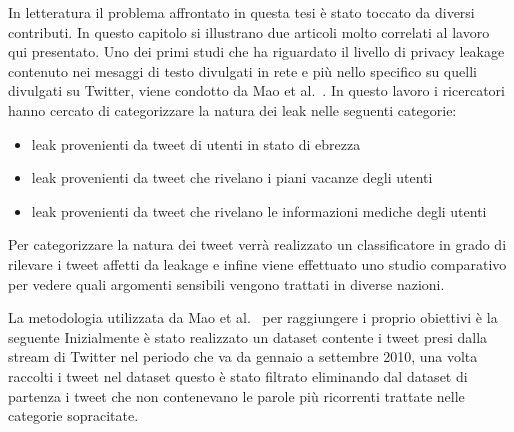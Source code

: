 In letteratura il problema affrontato in questa tesi è stato toccato da diversi contributi. In questo capitolo si illustrano due articoli molto correlati al lavoro qui presentato. Uno dei primi studi che ha riguardato il livello di privacy leakage contenuto nei mesaggi di testo divulgati in rete e più nello specifico su quelli divulgati su Twitter, viene condotto da Mao et al.~\cite{looseTweets}. In questo lavoro i ricercatori hanno cercato di categorizzare la natura dei leak nelle seguenti categorie:
\begin{itemize}
    \item leak provenienti da tweet di utenti in stato di ebrezza
    \item leak provenienti da tweet che rivelano i piani vacanze degli utenti
    \item leak provenienti da tweet che rivelano le informazioni mediche degli utenti
\end{itemize}
Per categorizzare la natura dei tweet verrà realizzato un classificatore in grado di rilevare i tweet affetti da leakage e infine viene effettuato uno studio comparativo per vedere quali argomenti sensibili vengono trattati in diverse nazioni.

La metodologia utilizzata da Mao et al.~\cite{looseTweets} per raggiungere i proprio obiettivi è la seguente
Inizialmente è stato realizzato un dataset contente i tweet presi dalla stream di Twitter nel periodo che va da gennaio a settembre 2010, una volta raccolti i tweet nel dataset questo è stato filtrato eliminando dal dataset di partenza i tweet che non contenevano le parole più ricorrenti trattate nelle categorie sopracitate. 

